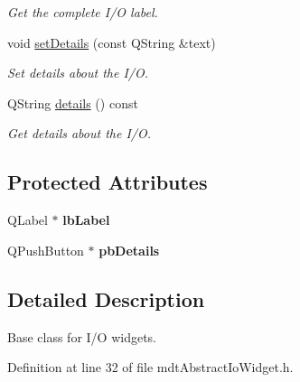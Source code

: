 \begin{DoxyCompactItemize}
\begin{DoxyCompactList}\small\item\em Get the complete I/O label. \end{DoxyCompactList}\item 
void \hyperlink{classmdt_abstract_io_widget_a62b50a0701fae84ca626675827b642cc}{setDetails} (const QString \&text)
\begin{DoxyCompactList}\small\item\em Set details about the I/O. \end{DoxyCompactList}\item 
\hypertarget{classmdt_abstract_io_widget_a7e4cdc43b700432ab185cbc5969e1bf2}{
QString \hyperlink{classmdt_abstract_io_widget_a7e4cdc43b700432ab185cbc5969e1bf2}{details} () const }
\label{classmdt_abstract_io_widget_a7e4cdc43b700432ab185cbc5969e1bf2}

\begin{DoxyCompactList}\small\item\em Get details about the I/O. \end{DoxyCompactList}\end{DoxyCompactItemize}
\subsection*{Protected Attributes}
\begin{DoxyCompactItemize}
\item 
\hypertarget{classmdt_abstract_io_widget_aad383dab877e327dc910a1f01ff5a3d9}{
QLabel $\ast$ {\bfseries lbLabel}}
\label{classmdt_abstract_io_widget_aad383dab877e327dc910a1f01ff5a3d9}

\item 
\hypertarget{classmdt_abstract_io_widget_a9dc1ad3754eb3e00c50bfba014e887f3}{
QPushButton $\ast$ {\bfseries pbDetails}}
\label{classmdt_abstract_io_widget_a9dc1ad3754eb3e00c50bfba014e887f3}

\end{DoxyCompactItemize}


\subsection{Detailed Description}
Base class for I/O widgets. 

Definition at line 32 of file mdtAbstractIoWidget.h.



